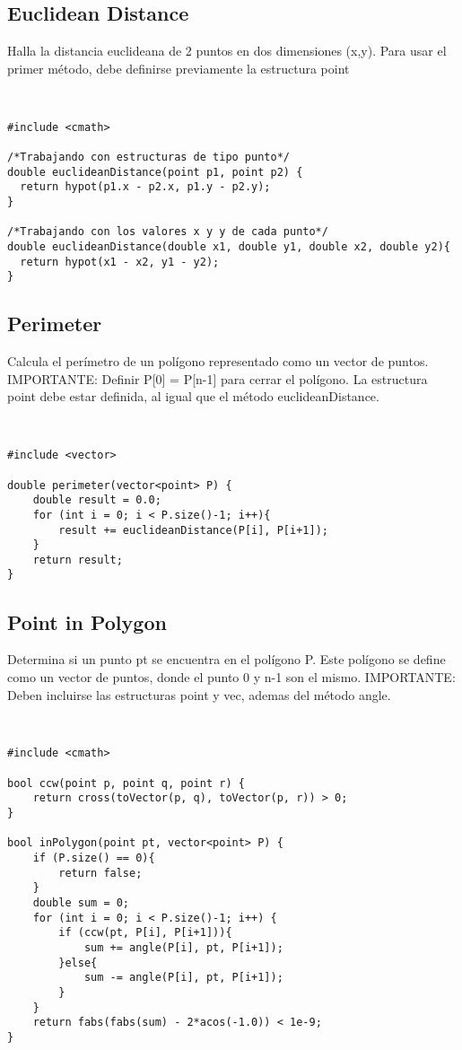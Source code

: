 \documentclass[11pt,letterpaper,twocolumn,twosided]{article}
\begin{document}
\subsection{Euclidean Distance}
Halla la distancia euclideana de 2 puntos en dos dimensiones (x,y). Para usar el primer m\'etodo, debe definirse previamente la estructura point
\begin{lstlisting}


#include <cmath>

/*Trabajando con estructuras de tipo punto*/
double euclideanDistance(point p1, point p2) {           
  return hypot(p1.x - p2.x, p1.y - p2.y); 
} 

/*Trabajando con los valores x y y de cada punto*/
double euclideanDistance(double x1, double y1, double x2, double y2){           
  return hypot(x1 - x2, y1 - y2); 
} 
\end{lstlisting}

\subsection{Perimeter}
Calcula el per\'imetro de un pol\'igono representado como un vector de puntos. IMPORTANTE: Definir P[0] = P[n-1] para cerrar el pol\'igono. La estructura point debe estar definida, al igual que el m\'etodo euclideanDistance.
\begin{lstlisting}


#include <vector>

double perimeter(vector<point> P) {
	double result = 0.0;
  	for (int i = 0; i < P.size()-1; i++){
    	result += euclideanDistance(P[i], P[i+1]);
  	}
  	return result; 
}

\end{lstlisting}

\subsection{Point in Polygon}
Determina si un punto pt se encuentra en el pol\'igono P. Este pol\'igono se define como un vector de puntos, donde el punto 0 y n-1 son el mismo. IMPORTANTE: Deben incluirse las estructuras point y vec, ademas del m\'etodo angle.
\begin{lstlisting}


#include <cmath>

bool ccw(point p, point q, point r) {
    return cross(toVector(p, q), toVector(p, r)) > 0; 
}
  
bool inPolygon(point pt, vector<point> P) {
	if (P.size() == 0){
  		return false;
  	} 
  	double sum = 0;    
  	for (int i = 0; i < P.size()-1; i++) {
    	if (ccw(pt, P[i], P[i+1])){
    		sum += angle(P[i], pt, P[i+1]); 
    	}else{
    		sum -= angle(P[i], pt, P[i+1]);
    	}
    }
  	return fabs(fabs(sum) - 2*acos(-1.0)) < 1e-9; 
}
\end{lstlisting}
\end{document}
